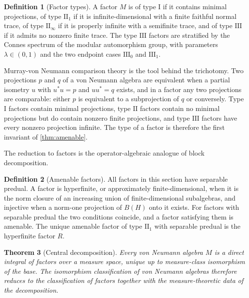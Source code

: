 \documentclass[11pt,letterpaper]{article}
\newtheorem{theorem}{Theorem}[section]
\theoremstyle{definition}
\newtheorem{definition}[theorem]{Definition}
\theoremstyle{remark}
\begin{document}
\begin{definition}[Factor types]
\label{def:factortype}
A factor $M$ is of type $\mathrm{I}$ if it contains minimal projections, of type $\mathrm{II}_1$ if it is infinite-dimensional with a finite faithful normal trace, of type $\mathrm{II}_\infty$ if it is properly infinite with a semifinite trace, and of type $\mathrm{III}$ if it admits no nonzero finite trace. The type $\mathrm{III}$ factors are stratified by the Connes spectrum of the modular automorphism group, with parameters $\lambda \in (0,1)$ and the two endpoint cases $\mathrm{III}_0$ and $\mathrm{III}_1$.
\end{definition}

Murray-von Neumann comparison theory is the tool behind the trichotomy. Two projections $p$ and $q$ of a von Neumann algebra are equivalent when a partial isometry $u$ with $u^* u = p$ and $u u^* = q$ exists, and in a factor any two projections are comparable: either $p$ is equivalent to a subprojection of $q$ or conversely. Type $\mathrm{I}$ factors contain minimal projections, type $\mathrm{II}$ factors contain no minimal projections but do contain nonzero finite projections, and type $\mathrm{III}$ factors have every nonzero projection infinite. The type of a factor is therefore the first invariant of \cref{thm:amenable}.

The reduction to factors is the operator-algebraic analogue of block decomposition.

\begin{definition}[Amenable factors]
\label{def:amenable}
All factors in this section have separable predual. A factor is hyperfinite, or approximately finite-dimensional, when it is the norm closure of an increasing union of finite-dimensional subalgebras, and injective when a norm-one projection of $B(H)$ onto it exists. For factors with separable predual the two conditions coincide, and a factor satisfying them is amenable. The unique amenable factor of type $\mathrm{II}_1$ with separable predual is the hyperfinite factor $R$.
\end{definition}

\begin{theorem}[Central decomposition]
\label{thm:central}
Every von Neumann algebra $M$ is a direct integral of factors over a measure space, unique up to measure-class isomorphism of the base. The isomorphism classification of von Neumann algebras therefore reduces to the classification of factors together with the measure-theoretic data of the decomposition.
\end{theorem}
\end{document}
